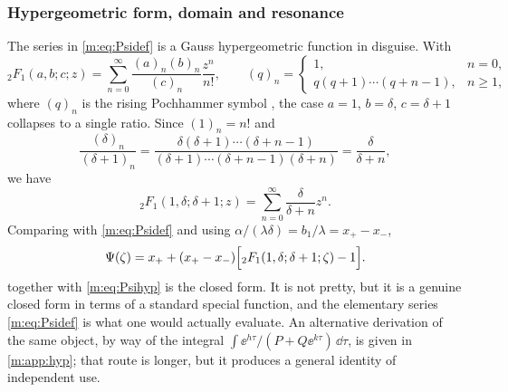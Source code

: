 \subsubsection{Hypergeometric form, domain and resonance}
\label{m:sec:abdhyp}

The series in \cref{m:eq:Psidef} is a Gauss hypergeometric function in disguise. With
\begin{equation}
\label{m:eq:2F1def}
{}_2F_1(a,b;c;z) = \sum_{n=0}^{\infty}\frac{(a)_n(b)_n}{(c)_n}\frac{z^n}{n!},
\qquad
(q)_n = \begin{cases}1, & n=0,\\ q(q+1)\cdots(q+n-1), & n\ge1,\end{cases}
\end{equation}
where $(q)_n$ is the rising Pochhammer symbol \cite{Olver2010}, the case $a=1$,
$b=\delta$, $c=\delta+1$ collapses to a single ratio. Since $(1)_n = n!$ and
\begin{equation}
\label{m:eq:pochcancel}
\frac{(\delta)_n}{(\delta+1)_n}
= \frac{\delta(\delta+1)\cdots(\delta+n-1)}{(\delta+1)\cdots(\delta+n-1)(\delta+n)}
= \frac{\delta}{\delta+n},
\end{equation}
we have
\begin{equation}
\label{m:eq:2F1simple}
{}_2F_1(1,\delta;\delta+1;z) = \sum_{n=0}^{\infty}\frac{\delta}{\delta+n}z^n .
\end{equation}
Comparing with \cref{m:eq:Psidef} and using
$\alpha/(\lambda\delta) = b_1/\lambda = x_+-x_-$,
\begin{equation}
\label{m:eq:Psihyp}
\Psi(\zeta) = x_+ + (x_+-x_-)\Bigl[{}_2F_1(1,\delta;\delta+1;\zeta)-1\Bigr] .
\end{equation}
 together with \cref{m:eq:Psihyp} is the closed form. It is not
pretty, but it is a genuine closed form in terms of a standard special function,
and the elementary series \cref{m:eq:Psidef} is what one would actually evaluate. An
alternative derivation of the same object, by way of the integral
$\int\ee^{h\tau}/(P+Q\ee^{k\tau})\,\dd\tau$, is given in \cref{m:app:hyp}; that route
is longer, but it produces a general identity of independent use.


